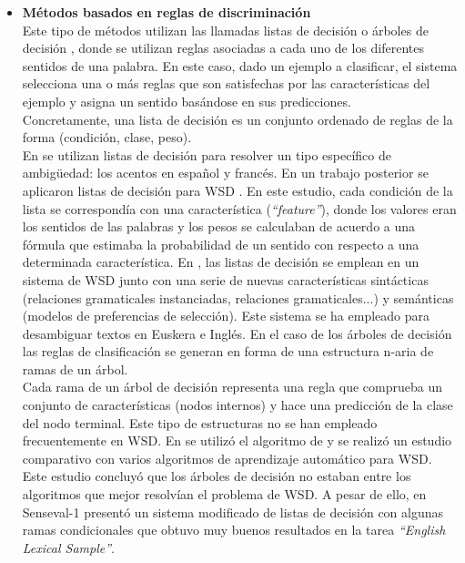 \begin{itemize}
  \item \textbf{Métodos basados en reglas de discriminación} \\
  Este tipo de métodos utilizan las llamadas listas de decisión \cite{027} o árboles de decisión \cite{028}, \cite{029} donde se utilizan reglas asociadas a cada uno de los diferentes sentidos de una palabra. En este caso, dado un ejemplo a clasificar, el sistema selecciona una o más reglas que son satisfechas por las características del ejemplo y asigna un sentido basándose en sus predicciones.\\
  Concretamente, una lista de decisión es un conjunto ordenado de reglas de la forma (condición, clase, peso).\\
  En \cite{030} se utilizan listas de decisión para resolver un tipo específico de ambigüedad: los acentos en español y francés. En un trabajo posterior se aplicaron listas de decisión para WSD \cite{031}. En este estudio, cada condición de la lista se correspondía con una característica (\textit{“feature”}), donde los valores eran los sentidos de las palabras y los pesos se calculaban de acuerdo a una fórmula que estimaba la probabilidad de un sentido con respecto a una determinada característica. En \cite{032}, \cite{033} las listas de decisión se emplean en un sistema de WSD junto con una serie de nuevas características sintácticas (relaciones gramaticales instanciadas, relaciones gramaticales...) y semánticas (modelos de preferencias de selección). Este sistema se ha empleado para desambiguar textos en Euskera e Inglés. En el caso de los árboles de decisión las reglas de clasificación se generan en forma de una estructura n-aria de ramas de un árbol. \\
  Cada rama de un árbol de decisión representa una regla que comprueba un conjunto de características (nodos internos) y hace una predicción de la clase del nodo terminal. Este tipo de estructuras no se han empleado frecuentemente en WSD. En \cite{025} se utilizó el algoritmo de \cite{029} y se realizó un estudio comparativo con varios algoritmos de aprendizaje automático para WSD. Este estudio concluyó que los árboles de decisión no estaban entre los algoritmos que mejor resolvían el problema de WSD. A pesar de ello, en Senseval-1 \cite{034} presentó un sistema modificado de listas de decisión con algunas ramas condicionales que obtuvo muy buenos resultados en la tarea \textit{“English Lexical Sample”}.


\end{itemize}
